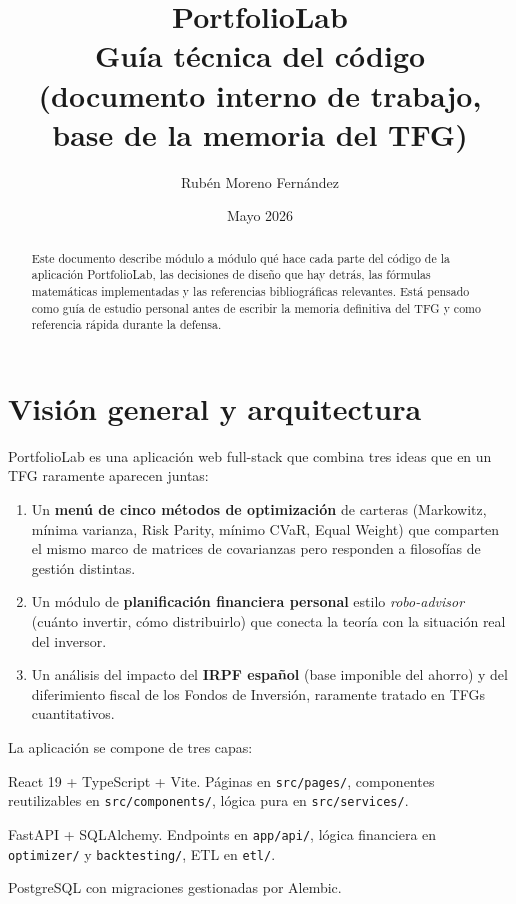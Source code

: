 \documentclass[11pt,a4paper]{article}
\title{\textbf{PortfolioLab}\\\large Guía técnica del código\\\small (documento interno de trabajo, base de la memoria del TFG)}
\author{Rubén Moreno Fernández}
\date{Mayo 2026}
\begin{document}
\maketitle
\thispagestyle{empty}

\begin{abstract}
\noindent Este documento describe módulo a módulo qué hace cada parte del código de la aplicación PortfolioLab, las decisiones de diseño que hay detrás, las fórmulas matemáticas implementadas y las referencias bibliográficas relevantes. Está pensado como guía de estudio personal antes de escribir la memoria definitiva del TFG y como referencia rápida durante la defensa.
\end{abstract}

\tableofcontents
\newpage

\section{Visión general y arquitectura}

PortfolioLab es una aplicación web full-stack que combina tres ideas que en un TFG raramente aparecen juntas:

\begin{enumerate}
  \item Un \textbf{menú de cinco métodos de optimización} de carteras (Markowitz, mínima varianza, Risk Parity, mínimo CVaR, Equal Weight) que comparten el mismo marco de matrices de covarianzas pero responden a filosofías de gestión distintas.
  \item Un módulo de \textbf{planificación financiera personal} estilo \textit{robo-advisor} (cuánto invertir, cómo distribuirlo) que conecta la teoría con la situación real del inversor.
  \item Un análisis del impacto del \textbf{IRPF español} (base imponible del ahorro) y del diferimiento fiscal de los Fondos de Inversión, raramente tratado en TFGs cuantitativos.
\end{enumerate}

La aplicación se compone de tres capas:

\begin{description}[leftmargin=1.4cm,labelwidth=1.2cm]
  \item[Frontend] React 19 + TypeScript + Vite. Páginas en \texttt{src/pages/}, componentes reutilizables en \texttt{src/components/}, lógica pura en \texttt{src/services/}.
  \item[Backend] FastAPI + SQLAlchemy. Endpoints en \texttt{app/api/}, lógica financiera en \texttt{optimizer/} y \texttt{backtesting/}, ETL en \texttt{etl/}.
  \item[Base de datos] PostgreSQL con migraciones gestionadas por Alembic.
\end{description}
\end{document}
